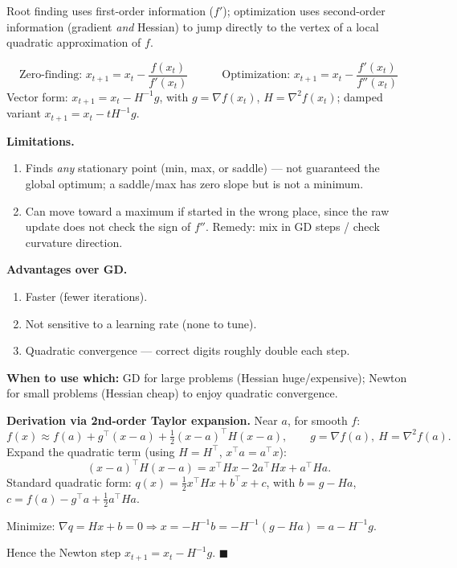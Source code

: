 \begin{defbox}
Root finding uses first-order information ($f'$); optimization uses second-order information (gradient \emph{and} Hessian) to jump directly to the vertex of a local quadratic approximation of $f$.
\end{defbox}

\[
\text{Zero-finding: } x_{t+1}=x_t-\frac{f(x_t)}{f'(x_t)} \qquad\quad \text{Optimization: } x_{t+1}=x_t-\frac{f'(x_t)}{f''(x_t)}
\]
Vector form: $x_{t+1}=x_t-H^{-1}g$, with $g=\nabla f(x_t)$, $H=\nabla^2 f(x_t)$; damped variant $x_{t+1}=x_t-tH^{-1}g$.

\textbf{Limitations.}
\begin{enumerate}
\item Finds \emph{any} stationary point (min, max, or saddle) — not guaranteed the global optimum; a saddle/max has zero slope but is not a minimum.
\item Can move toward a maximum if started in the wrong place, since the raw update does not check the sign of $f''$. Remedy: mix in GD steps / check curvature direction.
\end{enumerate}
\textbf{Advantages over GD.}
\begin{enumerate}
\item Faster (fewer iterations).
\item Not sensitive to a learning rate (none to tune).
\item Quadratic convergence — correct digits roughly double each step.
\end{enumerate}
\textbf{When to use which:} GD for large problems (Hessian huge/expensive); Newton for small problems (Hessian cheap) to enjoy quadratic convergence.

\begin{examplebox}
\textbf{Derivation via 2nd-order Taylor expansion.} Near $a$, for smooth $f$:
\[
f(x)\approx f(a) + g^\top(x-a) + \tfrac12 (x-a)^\top H (x-a), \qquad g=\nabla f(a),\ H=\nabla^2 f(a).
\]
Expand the quadratic term (using $H=H^\top$, $x^\top a = a^\top x$):
\[
(x-a)^\top H(x-a) = x^\top Hx - 2a^\top Hx + a^\top Ha.
\]
Standard quadratic form: $q(x)=\tfrac12 x^\top Hx + b^\top x + c$, with $b = g - Ha$, $c = f(a)-g^\top a+\tfrac12 a^\top Ha$.

Minimize: $\nabla q = Hx+b = 0 \Rightarrow x = -H^{-1}b = -H^{-1}(g-Ha) = a - H^{-1}g$.

Hence the Newton step $x_{t+1}=x_t - H^{-1}g$. $\blacksquare$
\end{examplebox}

